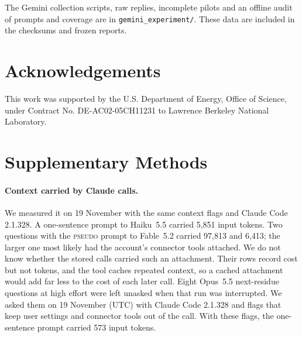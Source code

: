 \documentclass[11pt]{article}
\newcommand{\tpseudo}{\textmd{\textsc{pseudo}}}\newcommand{\tstrfn}{\textmd{\textsc{strfn}}}
\begin{document}
The Gemini collection scripts, raw replies, incomplete pilots and an offline audit of prompts and
coverage are in \texttt{gemini\_experiment/}. These data are included in the checksums and frozen
reports.

\section*{Acknowledgements}

This work was supported by the U.S. Department of Energy, Office of Science, under Contract No.
DE-AC02-05CH11231 to Lawrence Berkeley National Laboratory.




\clearpage
\appendix
\section*{Supplementary Methods}\label{sec:supp}

\paragraph{Context carried by Claude calls.} We measured it on 19 November with the same context flags and
Claude Code 2.1.328. A one-sentence prompt to Haiku~5.5 carried 5,851 input tokens. Two questions with the
\tpseudo{} prompt to Fable~5.2 carried 97,813 and 6,413; the larger one most likely had the account's
connector tools attached. We do not know whether the stored calls carried such an attachment. Their rows
record cost but not tokens, and the tool caches repeated context, so a cached attachment would add far
less to the cost of each later call. Eight Opus~5.5 next-residue questions at high effort were left
unasked when that run was interrupted. We asked them on 19 November (UTC) with Claude Code 2.1.328 and
flags that keep user settings and connector tools out of the call. With these flags, the one-sentence
prompt carried 573 input tokens.
\end{document}
